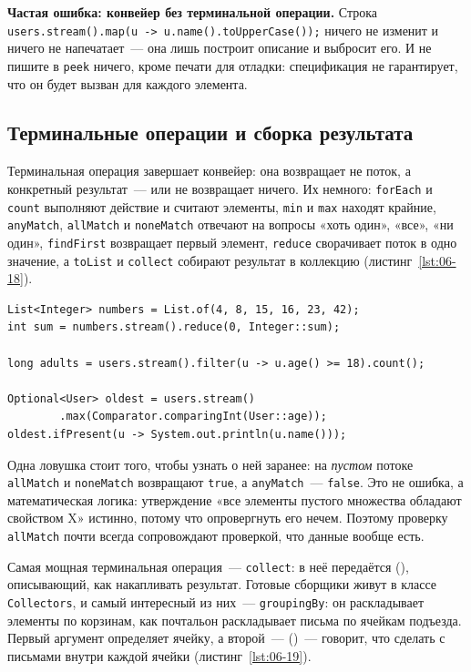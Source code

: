 \begin{oshibka}
\textbf{Частая ошибка: конвейер без терминальной операции.} Строка
\texttt{users.stream().map(u -> u.name().toUpperCase());} ничего не изменит и
ничего не напечатает~--- она лишь построит описание и выбросит его. И не
пишите в \texttt{peek} ничего, кроме печати для отладки: спецификация не
гарантирует, что он будет вызван для каждого элемента.
\end{oshibka}

\subsection{Терминальные операции и сборка результата}

Терминальная операция завершает конвейер: она возвращает не поток, а
конкретный результат~--- или не возвращает ничего. Их немного:
\texttt{forEach} и \texttt{count} выполняют действие и считают элементы,
\texttt{min} и \texttt{max} находят крайние, \texttt{anyMatch},
\texttt{allMatch} и \texttt{noneMatch} отвечают на вопросы «хоть один», «все»,
«ни один», \texttt{findFirst} возвращает первый элемент, \texttt{reduce}
сворачивает поток в одно значение, а \texttt{toList} и \texttt{collect}
собирают результат в коллекцию (листинг~\ref{lst:06-18}).

\begin{listing}[H]
\begin{verbatim}
List<Integer> numbers = List.of(4, 8, 15, 16, 23, 42);
int sum = numbers.stream().reduce(0, Integer::sum);

long adults = users.stream().filter(u -> u.age() >= 18).count();

Optional<User> oldest = users.stream()
        .max(Comparator.comparingInt(User::age));
oldest.ifPresent(u -> System.out.println(u.name()));
\end{verbatim}
\caption{Свёртка, подсчёты и поиск крайнего}
\label{lst:06-18}
\end{listing}

Одна ловушка стоит того, чтобы узнать о ней заранее: на \emph{пустом} потоке
\texttt{allMatch} и \texttt{noneMatch} возвращают \texttt{true}, а
\texttt{anyMatch}~--- \texttt{false}. Это не ошибка, а математическая логика:
утверждение «все элементы пустого множества обладают свойством X» истинно,
потому что опровергнуть его нечем. Поэтому проверку \texttt{allMatch} почти
всегда сопровождают проверкой, что данные вообще есть.

Самая мощная терминальная операция~--- \texttt{collect}: в неё передаётся
 (), описывающий, как накапливать результат.
Готовые сборщики живут в классе \texttt{Collectors}, и самый интересный из
них~--- \texttt{groupingBy}: он раскладывает элементы по корзинам, как
почтальон раскладывает письма по ячейкам подъезда. Первый аргумент определяет
ячейку, а второй~---  ()~---
говорит, что сделать с письмами внутри каждой ячейки
(листинг~\ref{lst:06-19}).

